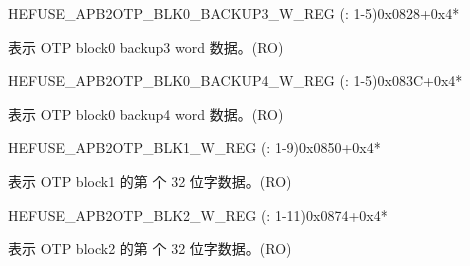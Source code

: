 \begin{register}{H}{EFUSE\_APB2OTP\_BLK0\_BACKUP3\_W\_REG (: 1-5)}{0x0828+0x4*}\label{regdesc:EFUSEAPB2OTPBLK0BACKUP3WNREG}
%
\regnewline%
\begin{regdesc}\begin{reglist}
\label{fielddesc:EFUSEAPB2OTPBLOCK0BACKUP3WN}\item [EFUSE\_APB2OTP\_BLOCK0\_BACKUP3\_W\regindex{n}] 表示 OTP block0 backup3 word 数据。(RO)
\end{reglist}\end{regdesc}
\end{register}


\begin{register}{H}{EFUSE\_APB2OTP\_BLK0\_BACKUP4\_W\_REG (: 1-5)}{0x083C+0x4*}\label{regdesc:EFUSEAPB2OTPBLK0BACKUP4WNREG}
%
\regnewline%
\begin{regdesc}\begin{reglist}
\label{fielddesc:EFUSEAPB2OTPBLOCK0BACKUP4WN}\item [EFUSE\_APB2OTP\_BLOCK0\_BACKUP4\_W\regindex{n}] 表示 OTP block0 backup4 word 数据。(RO)
\end{reglist}\end{regdesc}
\end{register}


\begin{register}{H}{EFUSE\_APB2OTP\_BLK1\_W\_REG (: 1-9)}{0x0850+0x4*}\label{regdesc:EFUSEAPB2OTPBLK1WNREG}
%
\regnewline%
\begin{regdesc}\begin{reglist}
\label{fielddesc:EFUSEAPB2OTPBLOCK1WN}\item [EFUSE\_APB2OTP\_BLOCK1\_W\regindex{n}] 表示 OTP block1 的第  个 32 位字数据。(RO)
\end{reglist}\end{regdesc}
\end{register}




\begin{register}{H}{EFUSE\_APB2OTP\_BLK2\_W\_REG (: 1-11)}{0x0874+0x4*}\label{regdesc:EFUSEAPB2OTPBLK2WNREG}
%
\regnewline%
\begin{regdesc}\begin{reglist}
\label{fielddesc:EFUSEAPB2OTPBLOCK2WN}\item [EFUSE\_APB2OTP\_BLOCK2\_W\regindex{n}] 表示 OTP block2 的第  个 32 位字数据。(RO)
\end{reglist}\end{regdesc}
\end{register}

